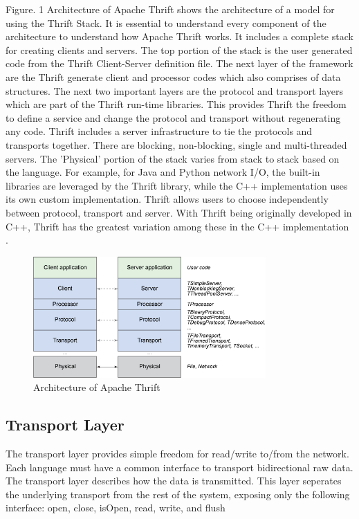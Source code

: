 \documentclass[9pt,twocolumn,twoside]{../../styles/osajnl}
\begin{document}
Figure. 1 Architecture of Apache Thrift shows the architecture of a model for using the Thrift Stack. It is essential to understand every component of the architecture to understand how Apache Thrift works. It includes a complete stack for creating clients and servers. The top portion of the stack is the user generated code from the Thrift Client-Server definition file. The next layer of the framework are the Thrift generate client and processor codes which also comprises of data structures. The next two important layers are the protocol and transport layers which are part of the Thrift run-time libraries. This provides Thrift the freedom to define a service and change the protocol and transport without regenerating any code. Thrift includes a server infrastructure to tie the protocols and transports together. There are blocking, non-blocking, single and multi-threaded servers. The 'Physical' portion of the stack varies from stack to stack based on the language. For example, for Java and Python network I/O, the built-in libraries are leveraged by the Thrift library, while the C++ implementation uses its own custom implementation. Thrift allows users to choose independently between protocol, transport and server. With Thrift being originally developed in C++, Thrift has the greatest variation among these in the C++ implementation \cite{www-thrift-example}.

\begin{figure}[h]
    \centering
    \includegraphics[width=3.5in]{images/thrift_arch.png}
    \caption{Architecture of Apache Thrift  \cite{www-thrift-arch}}
    \label{fig:thrift_arch}
\end{figure}


\subsection{Transport Layer}
The transport layer provides simple freedom for read/write to/from the network. Each language must have a common interface to transport bidirectional raw data. The transport layer describes how the data is transmitted. This layer seperates the underlying transport from the rest of the system, exposing only the following interface: open, close, isOpen, read, write, and flush
\end{document}
